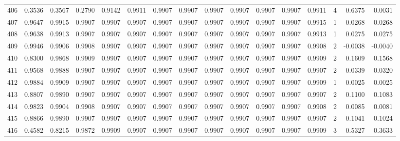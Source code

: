 \begin{tabular}{lrrrrrrrrrrrrrrr}
406 &      0.3536 &  0.3567 &  0.2790 &  0.9142 &  0.9911 &  0.9907 &  0.9907 &  0.9907 &  0.9907 &  0.9907 &   0.9907 &     0.9911 &      4 &                    0.6375 &                     0.0031 \\
407 &      0.9647 &  0.9915 &  0.9907 &  0.9907 &  0.9907 &  0.9907 &  0.9907 &  0.9907 &  0.9907 &  0.9907 &   0.9907 &     0.9915 &      1 &                    0.0268 &                     0.0268 \\
408 &      0.9638 &  0.9913 &  0.9907 &  0.9907 &  0.9907 &  0.9907 &  0.9907 &  0.9907 &  0.9907 &  0.9907 &   0.9907 &     0.9913 &      1 &                    0.0275 &                     0.0275 \\
409 &      0.9946 &  0.9906 &  0.9908 &  0.9907 &  0.9907 &  0.9907 &  0.9907 &  0.9907 &  0.9907 &  0.9907 &   0.9907 &     0.9908 &      2 &                   -0.0038 &                    -0.0040 \\
410 &      0.8300 &  0.9868 &  0.9909 &  0.9907 &  0.9907 &  0.9907 &  0.9907 &  0.9907 &  0.9907 &  0.9907 &   0.9907 &     0.9909 &      2 &                    0.1609 &                     0.1568 \\
411 &      0.9568 &  0.9888 &  0.9907 &  0.9907 &  0.9907 &  0.9907 &  0.9907 &  0.9907 &  0.9907 &  0.9907 &   0.9907 &     0.9907 &      2 &                    0.0339 &                     0.0320 \\
412 &      0.9884 &  0.9909 &  0.9907 &  0.9907 &  0.9907 &  0.9907 &  0.9907 &  0.9907 &  0.9907 &  0.9907 &   0.9907 &     0.9909 &      1 &                    0.0025 &                     0.0025 \\
413 &      0.8807 &  0.9890 &  0.9907 &  0.9907 &  0.9907 &  0.9907 &  0.9907 &  0.9907 &  0.9907 &  0.9907 &   0.9907 &     0.9907 &      2 &                    0.1100 &                     0.1083 \\
414 &      0.9823 &  0.9904 &  0.9908 &  0.9907 &  0.9907 &  0.9907 &  0.9907 &  0.9907 &  0.9907 &  0.9907 &   0.9907 &     0.9908 &      2 &                    0.0085 &                     0.0081 \\
415 &      0.8866 &  0.9890 &  0.9907 &  0.9907 &  0.9907 &  0.9907 &  0.9907 &  0.9907 &  0.9907 &  0.9907 &   0.9907 &     0.9907 &      2 &                    0.1041 &                     0.1024 \\
416 &      0.4582 &  0.8215 &  0.9872 &  0.9909 &  0.9907 &  0.9907 &  0.9907 &  0.9907 &  0.9907 &  0.9907 &   0.9907 &     0.9909 &      3 &                    0.5327 &                     0.3633 \\

\end{tabular}
